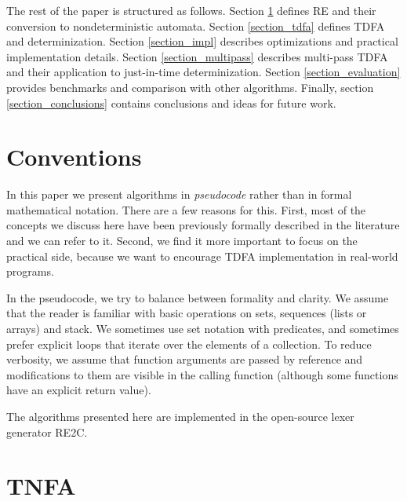 \documentclass[]{article}
\begin{document}
The rest of the paper is structured as follows.
Section \ref{section_tnfa} defines RE and their conversion to nondeterministic automata.
Section \ref{section_tdfa} defines TDFA and determinization.
Section \ref{section_impl} describes optimizations and practical implementation details.
Section \ref{section_multipass} describes multi-pass TDFA and their application to just-in-time determinization.
Section \ref{section_evaluation} provides benchmarks and comparison with other algorithms.
Finally, section \ref{section_conclusions} contains conclusions and ideas for future work.

\section*{Conventions}

In this paper we present algorithms in \emph{pseudocode} rather than in formal mathematical notation.
There are a few reasons for this.
First, most of the concepts we discuss here have been previously formally described in the literature and we can refer to it.
Second, we find it more important to focus on the practical side,
because we want to encourage TDFA implementation in real-world programs.
\medskip

In the pseudocode, we try to balance between formality and clarity.
We assume that the reader is familiar with basic operations on sets, sequences (lists or arrays) and stack.
We sometimes use set notation with predicates, and sometimes prefer explicit loops that iterate over the elements of a collection.
To reduce verbosity, we assume that function arguments are passed by reference and modifications to them are visible in the calling function
(although some functions have an explicit return value).
\medskip

The algorithms presented here are implemented in the open-source lexer generator RE2C.

\pagebreak

\section{TNFA}\label{section_tnfa}

\end{document}
